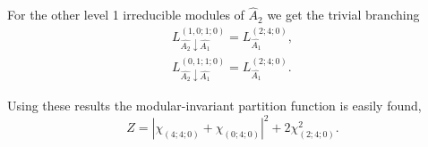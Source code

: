 \documentclass[12pt]{iopart}
\begin{document}
For the other level 1 irreducible modules of $\hat{A}_2$ we get the trivial
branching 
\begin{eqnarray}
  \label{eq:44}
   L^{(1,0;1;0)}_{\hat{A_2}\downarrow \hat{A_1}}= L_{\hat{A_1}}^{(2;4;0)},\\
   L^{(0,1;1;0)}_{\hat{A_2}\downarrow \hat{A_1}}= L_{\hat{A_1}}^{(2;4;0)}.
\end{eqnarray}

Using these results the modular-invariant partition function is easily found,
\begin{equation}
  \label{eq:45}
  Z=\left|\chi_{(4;4;0)}+\chi_{(0;4;0)}\right|^2+2\chi_{(2;4;0)}^2.
\end{equation}

% 
% 
% 
\end{document}
